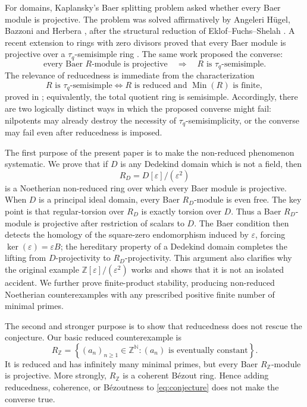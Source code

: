 \documentclass[11pt]{article}
\theoremstyle{definition}
\theoremstyle{remark}
\newcommand{\Min}{\operatorname{Min}}
\begin{document}
For domains, Kaplansky's Baer splitting problem asked whether every Baer module
is projective.  The problem was solved affirmatively by Angeleri H\"ugel,
Bazzoni and Herbera \cite{ABH}, after the structural reduction of
Eklof--Fuchs--Shelah \cite{EFS}.  A recent extension to rings with zero
divisors proved that every Baer module is projective over a
$\tau_q$-semisimple ring \cite{ZKBaer}.  The same work proposed the converse:
\begin{equation}\label{eq:conjecture}
  \text{every Baer $R$-module is projective}
  \quad\Longrightarrow\quad
  R\text{ is $\tau_q$-semisimple}.
\end{equation}
The relevance of reducedness is immediate from the characterization
\begin{equation}\label{eq:tauq-char}
 R\text{ is $\tau_q$-semisimple}
 \iff
 R\text{ is reduced and }\Min(R)\text{ is finite},
\end{equation}
proved in \cite{Ztauq}; equivalently, the total quotient ring is semisimple.
Accordingly, there are two logically distinct ways in which the proposed
converse might fail: nilpotents may already destroy the necessity of
$\tau_q$-semisimplicity, or the converse may fail even after reducedness is
imposed.

The first purpose of the present paper is to make the non-reduced phenomenon
systematic.  We prove that if $D$ is any Dedekind domain which is not a field,
then
\[
   R_D=D[\varepsilon]/(\varepsilon^2)
\]
is a Noetherian non-reduced ring over which every Baer module is projective.
When $D$ is a principal ideal domain, every Baer $R_D$-module is even free.
The key point is that regular-torsion over $R_D$ is exactly torsion over $D$.
Thus a Baer $R_D$-module is projective after restriction of scalars to $D$.
The Baer condition then detects the homology of the square-zero endomorphism
induced by $\varepsilon$, forcing
$\ker(\varepsilon)=\varepsilon B$; the hereditary property of a Dedekind
domain completes the lifting from $D$-projectivity to $R_D$-projectivity.
This argument also clarifies why the original example
$\mathbb Z[\varepsilon]/(\varepsilon^2)$ works and shows that it is not an
isolated accident.  We further prove finite-product stability, producing
non-reduced Noetherian counterexamples with any prescribed positive finite
number of minimal primes.

The second and stronger purpose is to show that reducedness does not rescue
the conjecture.  Our basic reduced counterexample is
\begin{equation}\label{eq:RZ}
 R_{\mathbb Z}
 =\left\{(a_n)_{n\ge 1}\in\mathbb Z^{\mathbb N}:
          (a_n)\text{ is eventually constant}\right\}.
\end{equation}
It is reduced and has infinitely many minimal primes, but every Baer
$R_{\mathbb Z}$-module is projective.  More strongly, $R_{\mathbb Z}$ is a
coherent B\'ezout ring.  Hence adding reducedness, coherence, or B\'ezoutness
to \eqref{eq:conjecture} does not make the converse true.
\end{document}
